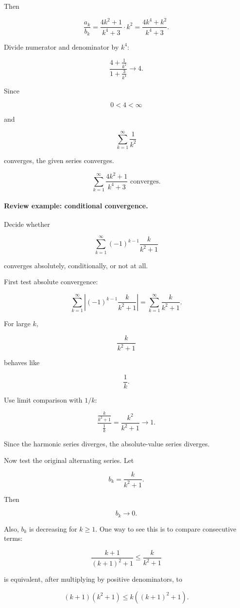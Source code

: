 Then

\[
\frac{a_k}{b_k}
=
\frac{4k^2+1}{k^4+3}\cdot k^2
=
\frac{4k^4+k^2}{k^4+3}.
\]

Divide numerator and denominator by \(k^4\):

\[
\frac{4+\frac1{k^2}}{1+\frac3{k^4}}\to4.
\]

Since

\[
0<4<\infty
\]

and

\[
\sum_{k=1}^{\infty}\frac1{k^2}
\]

converges, the given series converges.

\[
\boxed{
\sum_{k=1}^{\infty}\frac{4k^2+1}{k^4+3}
\text{ converges.}
}
\]

\paragraph{Review example: conditional convergence.}
Decide whether

\[
\sum_{k=1}^{\infty}(-1)^{k-1}\frac{k}{k^2+1}
\]

converges absolutely, conditionally, or not at all.

First test absolute convergence:

\[
\sum_{k=1}^{\infty}
\left|(-1)^{k-1}\frac{k}{k^2+1}\right|
=
\sum_{k=1}^{\infty}\frac{k}{k^2+1}.
\]

For large \(k\),

\[
\frac{k}{k^2+1}
\]

behaves like

\[
\frac1k.
\]

Use limit comparison with \(1/k\):

\[
\frac{\frac{k}{k^2+1}}{\frac1k}
=
\frac{k^2}{k^2+1}
\to1.
\]

Since the harmonic series diverges, the absolute-value series diverges.

Now test the original alternating series.  Let

\[
b_k=\frac{k}{k^2+1}.
\]

Then

\[
b_k\to0.
\]

Also, \(b_k\) is decreasing for \(k\ge1\).  One way to see this is to compare consecutive
terms:

\[
\frac{k+1}{(k+1)^2+1}
\le
\frac{k}{k^2+1}
\]

is equivalent, after multiplying by positive denominators, to

\[
(k+1)(k^2+1)\le k((k+1)^2+1).
\]

